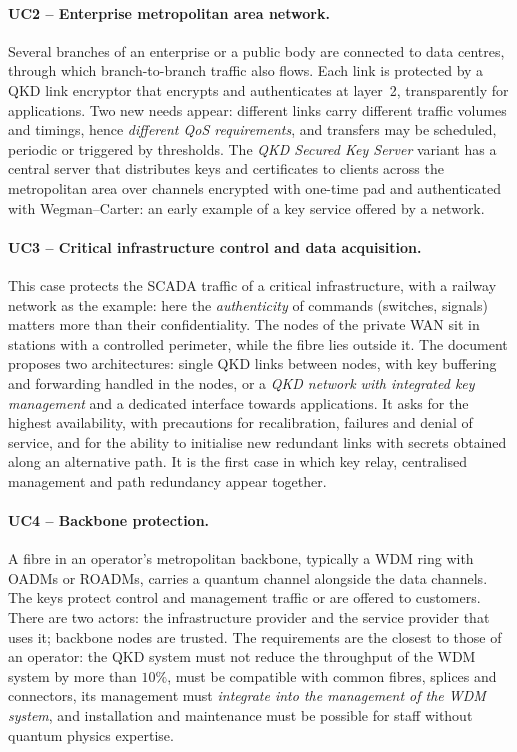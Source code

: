 \paragraph{UC2 – Enterprise metropolitan area network.}
Several branches of an enterprise or a public body are connected to data
centres, through which branch-to-branch traffic also flows. Each link is
protected by a QKD link encryptor that encrypts and authenticates at
layer~2, transparently for applications. Two new needs appear: different
links carry different traffic volumes and timings, hence \emph{different
QoS requirements}, and transfers may be scheduled, periodic or triggered by
thresholds. The \emph{QKD Secured Key Server} variant has a central server
that distributes keys and certificates to clients across the metropolitan
area over channels encrypted with one-time pad and authenticated with
Wegman–Carter: an early example of a key service offered by a network.

\paragraph{UC3 – Critical infrastructure control and data acquisition.}
This case protects the SCADA traffic of a critical infrastructure, with a
railway network as the example: here the \emph{authenticity} of commands
(switches, signals) matters more than their confidentiality. The nodes of
the private WAN sit in stations with a controlled perimeter, while the
fibre lies outside it. The document proposes two architectures: single QKD
links between nodes, with key buffering and forwarding handled in the
nodes, or a \emph{QKD network with integrated key management} and a
dedicated interface towards applications. It asks for the highest
availability, with precautions for recalibration, failures and denial of
service, and for the ability to initialise new redundant links with secrets
obtained along an alternative path. It is the first case in which key
relay, centralised management and path redundancy appear together.

\paragraph{UC4 – Backbone protection.}
A fibre in an operator's metropolitan backbone, typically a WDM ring with
OADMs or ROADMs, carries a quantum channel alongside the data channels. The
keys protect control and management traffic or are offered to customers.
There are two actors: the infrastructure provider and the service provider
that uses it; backbone nodes are trusted. The requirements are the closest
to those of an operator: the QKD system must not reduce the throughput of
the WDM system by more than $10\%$, must be compatible with common fibres,
splices and connectors, its management must \emph{integrate into the
management of the WDM system}, and installation and maintenance must be
possible for staff without quantum physics expertise.


